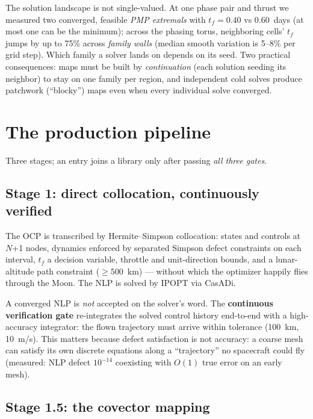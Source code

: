 \documentclass[11pt]{article}
\begin{document}
The solution landscape is not single-valued. At one phase pair and thrust
we measured two converged, feasible \emph{PMP extremals} with
$t_f = 0.40$ vs $0.60$~days (at most one can be the minimum); across the phasing torus, neighboring cells'
$t_f$ jumps by up to 75\% across \emph{family walls} (median smooth
variation is 5--8\% per grid step). Which family a solver lands on depends
on its seed. Two practical consequences: maps must be built by
\emph{continuation} (each solution seeding its neighbor) to stay on one
family per region, and independent cold solves produce patchwork
(``blocky'') maps even when every individual solve converged.

\section{The production pipeline}

Three stages; an entry joins a library only after passing \emph{all
three gates}.

\subsection{Stage 1: direct collocation, continuously verified}

The OCP is transcribed by Hermite--Simpson collocation: states and controls
at $N$+1 nodes, dynamics enforced by separated Simpson defect constraints
on each interval, $t_f$ a decision variable, throttle and unit-direction
bounds, and a lunar-altitude path constraint ($\geq 500$~km) --- without
which the optimizer happily flies through the Moon. The NLP is solved by
IPOPT via CasADi.

A converged NLP is \emph{not} accepted on the solver's word. The
\textbf{continuous verification gate} re-integrates the solved control
history end-to-end with a high-accuracy integrator: the flown trajectory
must arrive within tolerance (100~km, 10~m/s). This matters because defect
satisfaction is not accuracy: a coarse mesh can satisfy its own discrete
equations along a ``trajectory'' no spacecraft could fly (measured: NLP
defect $10^{-14}$ coexisting with $O(1)$ true error on an early
mesh).

\subsection{Stage 1.5: the covector mapping}
\label{sec:covector}
\end{document}
